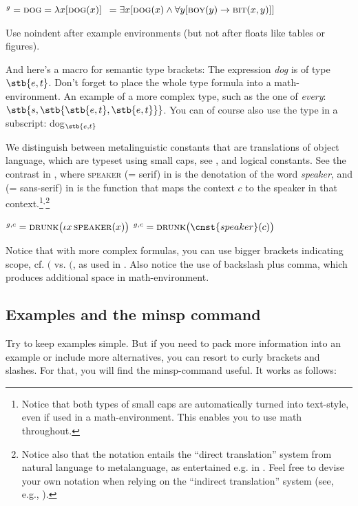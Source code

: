 \ea \ea {}$^g=\textsc{dog}=\lambda x[\textsc{dog}(x)]$\label{sim:ex:dog}
\ex {}${}=\exists x[\textsc{dog}(x)\wedge\forall y[\textsc{boy}(y)\rightarrow \textsc{bit}(x,y)]]$\label{sim:ex:quant}
\z\z

\noindent Use noindent after example environments (but not after floats like tables or figures).

And here's a macro for semantic type brackets: The expression \textit{dog} is of type $\stb{e,t}$. Don't forget to place the whole type formula into a math-environment. An example of a more complex type, such as the one of \textit{every}: $\stb{s,\stb{\stb{e,t},\stb{e,t}}}$. You can of course also use the type in a subscript: dog$_{\stb{e,t}}$

We distinguish between metalinguistic constants that are translations of object language, which are typeset using small caps, see , and logical constants. See the contrast in , where \textsc{speaker} (= serif) in  is the denotation of the word \textit{speaker}, and  (= sans-serif) in  is the function that maps the context $c$ to the speaker in that context.\footnote{Notice that both types of small caps are automatically turned into text-style, even if used in a math-environment. This enables you to use math throughout.}$^,$\footnote{Notice also that the notation entails the ``direct translation'' system from natural language to metalanguage, as entertained e.g. in \citet{Heim.Kratzer1998}. Feel free to devise your own notation when relying on the ``indirect translation'' system (see, e.g., \citealt{Coppock.Champollion2022}).}

\ea\label{sim:ex:speaker}
\ea {}$^{g,c}=\textsc{drunk}\big(\iota x\,\textsc{speaker}(x)\big)$\label{sim:ex:speaker-a}
\ex {}$^{g,c}=\textsc{drunk}\big(\cnst{speaker}(c)\big)$\label{sim:ex:speaker-b}
\z\z

\noindent Notice that with more complex formulas, you can use bigger brackets indicating scope, cf. $($ vs. $\big($, as used in . Also notice the use of backslash plus comma, which produces additional space in math-environment.

\subsection{Examples and the minsp command}

Try to keep examples simple. But if you need to pack more information into an example or include more alternatives, you can resort to curly brackets and slashes. For that, you will find the minsp-command useful. It works as follows:

